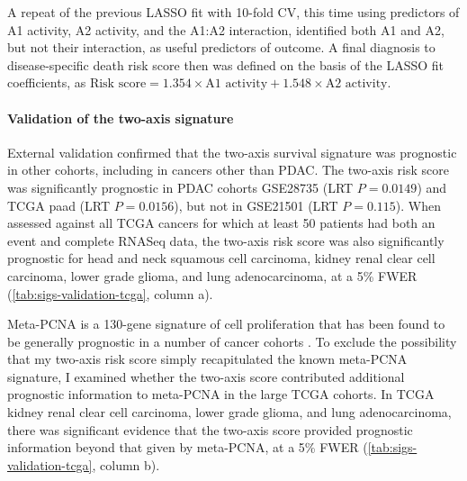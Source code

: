 \documentclass[dissertation.tex]{subfiles}
\begin{document}
A repeat of the previous \gls{LASSO} fit with 10-fold \gls{CV}, this time using predictors of A1 activity, A2 activity, and the A1:A2 interaction, identified both A1 and A2, but not their interaction, as useful predictors of outcome.  A final diagnosis to disease-specific death risk score then was defined on the basis of the \gls{LASSO} fit coefficients, as $\text{Risk score} = 1.354 \times \text{A1 activity} + 1.548 \times \text{A2 activity}$.

\paragraph{Validation of the two-axis signature}
External validation confirmed that the two-axis survival signature was prognostic in other cohorts, including in cancers other than \gls{PDAC}.  The two-axis risk score was significantly prognostic in \gls{PDAC} cohorts GSE28735 \cite{Zhang2013} (LRT $P = 0.0149$) and \gls{TCGA} paad (LRT $P = 0.0156$), but not in GSE21501 \cite{Stratford2010} (LRT $P = 0.115$).  When assessed against all \gls{TCGA} cancers for which at least 50 patients had both an event and complete RNASeq data, the two-axis risk score was also significantly prognostic for head and neck squamous cell carcinoma, kidney renal clear cell carcinoma, lower grade glioma, and lung adenocarcinoma, at a 5\% \gls{FWER} (\cref{tab:sigs-validation-tcga}, column a).

Meta-PCNA is a 130-gene signature of cell proliferation that has been found to be generally prognostic in a number of cancer cohorts \cite{Venet2011}.  To exclude the possibility that my two-axis risk score simply recapitulated the known meta-PCNA signature, I examined whether the two-axis score contributed additional prognostic information to meta-PCNA in the large \gls{TCGA} cohorts.  In \gls{TCGA} kidney renal clear cell carcinoma, lower grade glioma, and lung adenocarcinoma, there was significant evidence that the two-axis score provided prognostic information beyond that given by meta-PCNA, at a 5\% \gls{FWER} (\cref{tab:sigs-validation-tcga}, column b).
\end{document}
